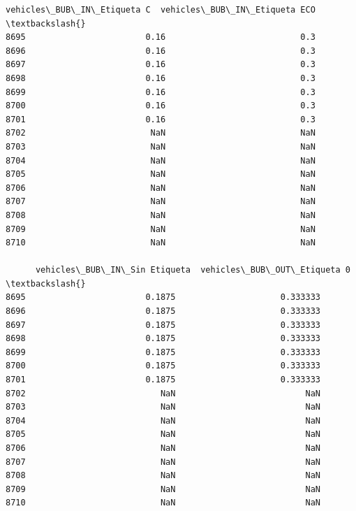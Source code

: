 \documentclass[11pt]{article}
\begin{document}
\begin{tcolorbox}[breakable, size=fbox, boxrule=.5pt, pad at break*=1mm, opacityfill=0]
\begin{Verbatim}[commandchars=\\\{\}]
      vehicles\_BUB\_IN\_Etiqueta C  vehicles\_BUB\_IN\_Etiqueta ECO  \textbackslash{}
8695                        0.16                           0.3
8696                        0.16                           0.3
8697                        0.16                           0.3
8698                        0.16                           0.3
8699                        0.16                           0.3
8700                        0.16                           0.3
8701                        0.16                           0.3
8702                         NaN                           NaN
8703                         NaN                           NaN
8704                         NaN                           NaN
8705                         NaN                           NaN
8706                         NaN                           NaN
8707                         NaN                           NaN
8708                         NaN                           NaN
8709                         NaN                           NaN
8710                         NaN                           NaN

      vehicles\_BUB\_IN\_Sin Etiqueta  vehicles\_BUB\_OUT\_Etiqueta 0  \textbackslash{}
8695                        0.1875                     0.333333
8696                        0.1875                     0.333333
8697                        0.1875                     0.333333
8698                        0.1875                     0.333333
8699                        0.1875                     0.333333
8700                        0.1875                     0.333333
8701                        0.1875                     0.333333
8702                           NaN                          NaN
8703                           NaN                          NaN
8704                           NaN                          NaN
8705                           NaN                          NaN
8706                           NaN                          NaN
8707                           NaN                          NaN
8708                           NaN                          NaN
8709                           NaN                          NaN
8710                           NaN                          NaN


\end{Verbatim}
\end{tcolorbox}
\end{document}
